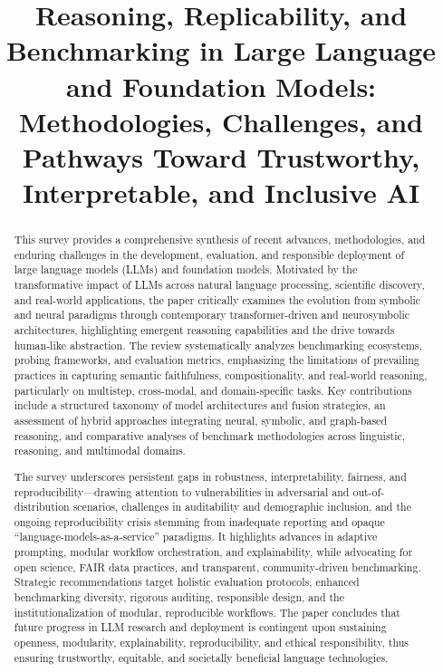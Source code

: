 \title{Reasoning, Replicability, and Benchmarking in Large Language and Foundation Models: Methodologies, Challenges, and Pathways Toward Trustworthy, Interpretable, and Inclusive AI}
\maketitle

\begin{abstract}
This survey provides a comprehensive synthesis of recent advances, methodologies, and enduring challenges in the development, evaluation, and responsible deployment of large language models (LLMs) and foundation models. Motivated by the transformative impact of LLMs across natural language processing, scientific discovery, and real-world applications, the paper critically examines the evolution from symbolic and neural paradigms through contemporary transformer-driven and neurosymbolic architectures, highlighting emergent reasoning capabilities and the drive towards human-like abstraction. The review systematically analyzes benchmarking ecosystems, probing frameworks, and evaluation metrics, emphasizing the limitations of prevailing practices in capturing semantic faithfulness, compositionality, and real-world reasoning, particularly on multistep, cross-modal, and domain-specific tasks. Key contributions include a structured taxonomy of model architectures and fusion strategies, an assessment of hybrid approaches integrating neural, symbolic, and graph-based reasoning, and comparative analyses of benchmark methodologies across linguistic, reasoning, and multimodal domains.

The survey underscores persistent gaps in robustness, interpretability, fairness, and reproducibility—drawing attention to vulnerabilities in adversarial and out-of-distribution scenarios, challenges in auditability and demographic inclusion, and the ongoing reproducibility crisis stemming from inadequate reporting and opaque “language-models-as-a-service” paradigms. It highlights advances in adaptive prompting, modular workflow orchestration, and explainability, while advocating for open science, FAIR data practices, and transparent, community-driven benchmarking. Strategic recommendations target holistic evaluation protocols, enhanced benchmarking diversity, rigorous auditing, responsible design, and the institutionalization of modular, reproducible workflows. The paper concludes that future progress in LLM research and deployment is contingent upon sustaining openness, modularity, explainability, reproducibility, and ethical responsibility, thus ensuring trustworthy, equitable, and societally beneficial language technologies.
\end{abstract}

